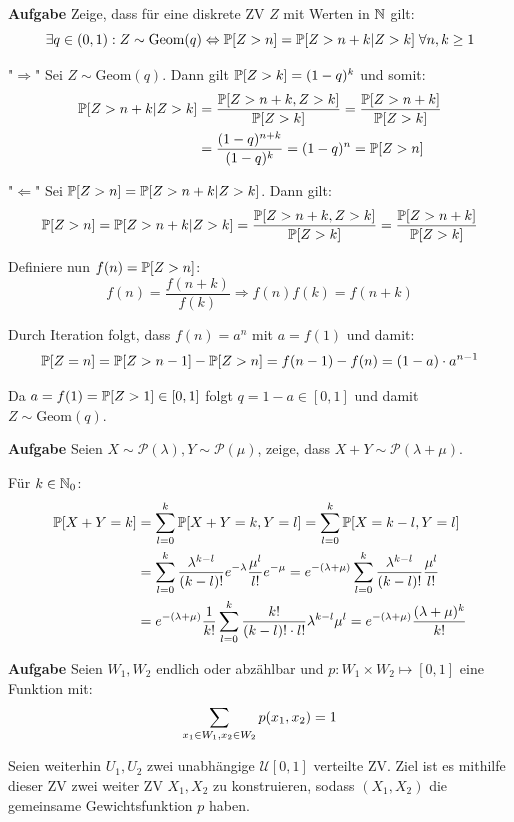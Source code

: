 \hrulefill

\textbf{Aufgabe}
Zeige, dass für eine diskrete ZV $Z$ mit Werten in $\mathbb{N}$ gilt:
$$\exists q \in (0,1): Z \sim \text{Geom}(q) \Leftrightarrow \mathbb{P}[Z > n] = \mathbb{P}[Z > n + k | Z > k] \; \forall n,k \geq 1 $$

"$\Rightarrow$" Sei $Z \sim \text{Geom}(q)$. Dann gilt $\mathbb{P}[Z > k] = (1-q)^k$ und somit:
\begin{align*}
	\mathbb{P}[Z > n + k | Z > k] &= \frac{\mathbb{P}[Z > n + k, Z > k]}{\mathbb{P}[Z > k]} = \frac{\mathbb{P}[Z > n + k]}{\mathbb{P}[Z > k]} \\
	&= \frac{(1-q)^{n+k}}{(1-q)^k} = (1-q)^n = \mathbb{P}[Z > n]
\end{align*}

"$\Leftarrow$" Sei $\mathbb{P}[Z > n] = \mathbb{P}[Z > n + k | Z > k]$. Dann gilt:
$$\mathbb{P}[Z > n] = \mathbb{P}[Z > n + k | Z > k] = \frac{\mathbb{P}[Z > n + k, Z > k]}{\mathbb{P}[Z > k]} = \frac{\mathbb{P}[Z > n + k]}{\mathbb{P}[Z > k]}$$

Definiere nun $f(n) = \mathbb{P}[Z > n]$:
$$f(n) = \frac{f(n+k)}{f(k)} \Rightarrow f(n) f(k) = f(n+k)$$

Durch Iteration folgt, dass $f(n) = a^n$ mit $a = f(1)$ und damit:
$$\mathbb{P}[Z = n] = \mathbb{P}[Z > n-1] - \mathbb{P}[Z > n] = f(n-1) - f(n) = (1-a) \cdot a^{n-1}$$

Da $a = f(1) = \mathbb{P}[Z > 1] \in [0,1]$ folgt $q = 1-a \in [0,1]$ und damit $Z \sim \text{Geom}(q)$.

\hrulefill

\textbf{Aufgabe}
Seien $X \sim \mathcal P (\lambda), Y \sim \mathcal P (\mu)$, zeige, dass $X + Y \sim \mathcal P (\lambda + \mu)$.

Für $k \in \mathbb{N}_0$:
\begin{align*}
	\mathbb{P}[X + Y = k] &= \sum_{l = 0}^k \mathbb{P}[X + Y = k, Y = l] = \sum_{l = 0}^k \mathbb{P}[X = k - l, Y = l] \\
	&= \sum_{l = 0}^k \frac{\lambda^{k-l}}{(k-l)!}e^{-\lambda} \frac{\mu^l}{l!}e^{-\mu} = e^{-(\lambda + \mu)} \sum_{l = 0}^k \frac{\lambda^{k-l}}{(k-l)!}\frac{\mu^l}{l!} \\
	&= e^{-(\lambda + \mu)} \frac{1}{k!} \sum_{l = 0}^k \frac{k!}{(k-l)! \cdot l!} \lambda^{k-l} \mu^l = e^{-(\lambda + \mu)} \frac{(\lambda + \mu)^k}{k!}
\end{align*}

\hrulefill

\textbf{Aufgabe}
Seien $W_1, W_2$ endlich oder abzählbar und $p : W_1 \times W_2 \mapsto [0,1]$ eine Funktion mit:
$$\sum\limits_{x_1 \in W_1, x_2 \in W_2}p(x_1, x_2) = 1$$

Seien weiterhin $U_1, U_2$ zwei unabhängige $\mathcal U [0,1]$ verteilte ZV. Ziel ist es mithilfe dieser ZV zwei weiter ZV $X_1, X_2$ zu konstruieren, sodass $(X_1, X_2)$ die gemeinsame Gewichtsfunktion $p$ haben. \smallskip

